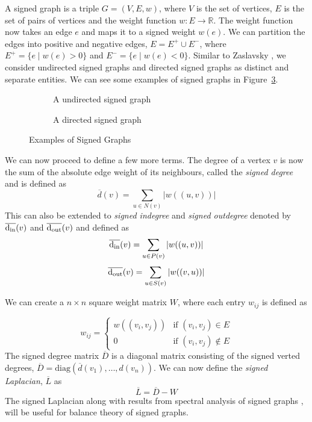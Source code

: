 A signed graph is a triple $G=(V,E,w)$, where $V$ is the set of vertices, $E$ is the set of pairs of vertices and the weight function $w:E \rightarrow \mathbb{R}$. The weight function now takes an edge $e$ and maps it to a signed weight $w(e)$. We can partition the edges into positive and negative edges, $E = E^{+}\cup E^{-}$, where $E^{+} = \{e \mid w(e)>0\}$ and $E^{-}=\{e \mid w(e)<0\}$. Similar to Zaslavsky \cite{zaslavsky1982signed}, we consider undirected signed graphs and directed signed graphs as distinct and separate entities. We can see some examples of signed graphs in Figure~\ref{fig:signed-graphs}.
\begin{figure}[!ht]
    \centering
    \begin{subfigure}{0.5\textwidth}
        \centering
        
        \caption{A undirected signed graph}
        \label{fig:signed-undirected}
    \end{subfigure}

    \begin{subfigure}{0.5\textwidth}
        \centering
        
        \caption{A directed signed graph}
        \label{fig:signed-directed graph}
    \end{subfigure}
    \caption{Examples of Signed Graphs}
    \label{fig:signed-graphs}
\end{figure}

We can now proceed to define a few more terms. The degree of a vertex $v$ is now the sum of the absolute edge weight of its neighbours, called the \textit{signed degree} and is defined as 
\[
    \overline{d}(v) = \sum_{u \in N(v)}|w((u,v))|
\] 
This can also be extended to \textit{signed indegree} and \textit{signed outdegree} denoted by $\overline{\operatorname*{d_{\text{in}}}}(v)$ and $\overline{\operatorname*{d_{\text{out}}}}(v)$ and defined as
\[
    \overline{\operatorname*{d_{\text{in}}}}(v)=\sum_{u \in P(v)}|w((u,v))|
\] 
\[
    \overline{\operatorname*{d_{\text{out}}}}(v)=\sum_{u \in S(v)}|w((v,u))|
\] 

We can create a $n \times n$ square weight matrix $W$, where each entry $w_{ij}$ is defined as 

\[ w_{ij} = 
\begin{cases}
    w((v_i,v_j)) & \text{if } (v_i,v_j) \in E \\
    0 & \text{if } (v_i,v_j) \notin E      
\end{cases}
\] 
The signed degree matrix $\overline{D}$ is a diagonal matrix consisting of the signed verted degrees, $\overline{D} = \text{diag}(\overline{d}(v_{1}),\dots,d(v_n))$. We can now define the \textit{signed Laplacian}, $\overline{L}$ as 
\[ \overline{L} = \overline{D} - W\]
The signed Laplacian along with results from spectral analysis of signed graphs \cite{hou2005bounds,kunegis2010spectral}, will be useful for balance theory of signed graphs. 

